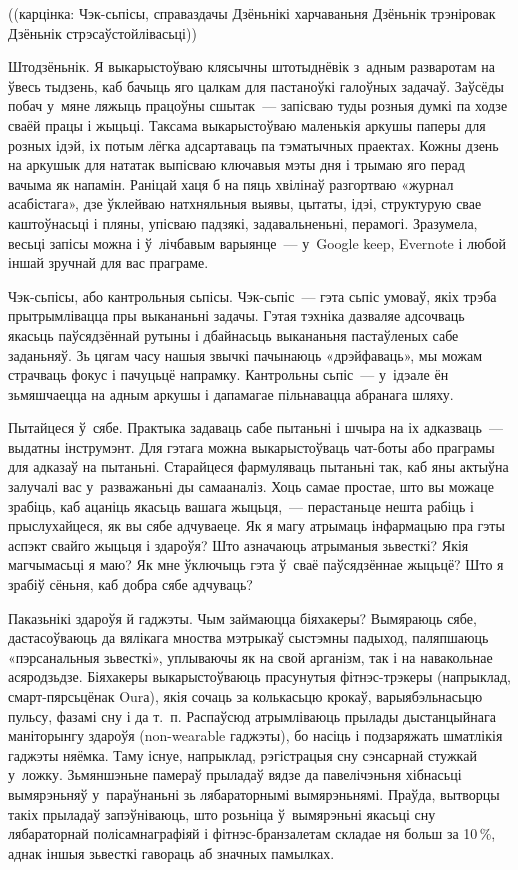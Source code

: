 ((карцінка: Чэк-сьпісы, справаздачы Дзёньнікі харчаваньня Дзёньнік трэніровак Дзёньнік стрэсаўстойлівасьці))

Штодзёньнік. Я выкарыстоўваю клясычны штотыднёвік з~адным разваротам на ўвесь тыдзень, каб бачыць яго цалкам для пастаноўкі галоўных задачаў. Заўсёды побач у~мяне ляжыць працоўны сшытак~--- запісваю туды розныя думкі па ходзе сваёй працы і жыцьці. Таксама выкарыстоўваю маленькія аркушы паперы для розных ідэй, іх потым лёгка адсартаваць па тэматычных праектах. Кожны дзень на аркушык для нататак выпісваю ключавыя мэты дня і трымаю яго перад вачыма як напамін. Раніцай хаця б на пяць хвілінаў разгортваю «журнал асабістага», дзе ўклейваю натхняльныя выявы, цытаты, ідэі, структурую свае каштоўнасьці і пляны, упісваю падзякі, задавальненьні, перамогі. Зразумела, весьці запісы можна і ў~лічбавым варыянце~--- у~Google keep, Evernote і любой іншай зручнай для вас праграме.

Чэк-сьпісы, або кантрольныя сьпісы. Чэк-сьпіс~--- гэта сьпіс умоваў, якіх трэба прытрымлівацца пры выкананьні задачы. Гэтая тэхніка дазваляе адсочваць якасьць паўсядзённай рутыны і дбайнасьць выкананьня пастаўленых сабе заданьняў. Зь цягам часу нашыя звычкі пачынаюць «дрэйфаваць», мы можам страчваць фокус і пачуцьцё напрамку. Кантрольны сьпіс~--- у~ідэале ён зьмяшчаецца на адным аркушы і дапамагае пільнавацца абранага шляху.

Пытайцеся ў~сябе. Практыка задаваць сабе пытаньні і шчыра на іх адказваць~--- выдатны інструмэнт. Для гэтага можна выкарыстоўваць чат-боты або праграмы для адказаў на пытаньні. Старайцеся фармуляваць пытаньні так, каб яны актыўна залучалі вас у~разважаньні ды самааналіз. Хоць самае простае, што вы можаце зрабіць, каб ацаніць якасьць вашага жыцьця,~--- перастаньце нешта рабіць і прыслухайцеся, як вы сябе адчуваеце. Як я магу атрымаць інфармацыю пра гэты аспэкт свайго жыцьця і здароўя? Што азначаюць атрыманыя зьвесткі? Якія магчымасьці я маю? Як мне ўключыць гэта ў~сваё паўсядзённае жыцьцё? Што я зрабіў сёньня, каб добра сябе адчуваць?

Паказьнікі здароўя й гаджэты. Чым займаюцца біяхакеры? Вымяраюць сябе, дастасоўваюць да вялікага мноства мэтрыкаў сыстэмны падыход, паляпшаюць «пэрсанальныя зьвесткі», уплываючы як на свой арганізм, так і на навакольнае асяродзьдзе. Біяхакеры выкарыстоўваюць прасунутыя фітнэс-трэкеры (напрыклад, смарт-пярсьцёнак Ourа), якія сочаць за колькасьцю крокаў, варыябэльнасьцю пульсу, фазамі сну і да т.~п. Распаўсюд атрымліваюць прылады дыстанцыйнага маніторынгу здароўя (non-wearable гаджэты), бо насіць і подзаряжать шматлікія гаджэты няёмка. Таму існуе, напрыклад, рэгістрацыя сну сэнсарнай стужкай у~ложку. Зьмяншэньне памераў прыладаў вядзе да павелічэньня хібнасьці вымярэньняў у~параўнаньні зь лябараторнымі вымярэньнямі. Праўда, вытворцы такіх прыладаў запэўніваюць, што розьніца ў~вымярэньні якасьці сну лябараторнай полісамнаграфіяй і фітнэс-бранзалетам складае ня больш за 10\,\%, аднак іншыя зьвесткі гавораць аб значных памылках.

